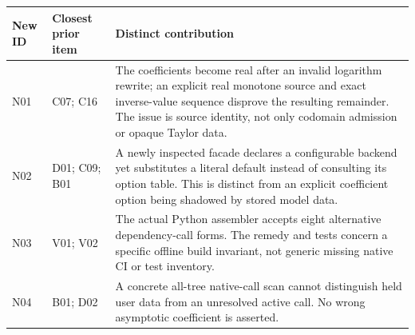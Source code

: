 \documentclass[11pt,a4paper]{article}
\begin{document}
\begin{longtable}{@{}p{}p{}p{}@{}}
\toprule
New ID & Closest prior item & Distinct contribution\\
\midrule
\endhead
N01 & C07; C16 & The coefficients become real after an invalid logarithm rewrite; an explicit real monotone source and exact inverse-value sequence disprove the resulting remainder. The issue is source identity, not only codomain admission or opaque Taylor data.\\[5pt]
N02 & D01; C09; B01 & A newly inspected facade declares a configurable backend yet substitutes a literal default instead of consulting its option table. This is distinct from an explicit coefficient option being shadowed by stored model data.\\[5pt]
N03 & V01; V02 & The actual Python assembler accepts eight alternative dependency-call forms. The remedy and tests concern a specific offline build invariant, not generic missing native CI or test inventory.\\[5pt]
N04 & B01; D02 & A concrete all-tree native-call scan cannot distinguish held user data from an unresolved active call. No wrong asymptotic coefficient is asserted.\\
\bottomrule
\end{longtable}
\end{document}
